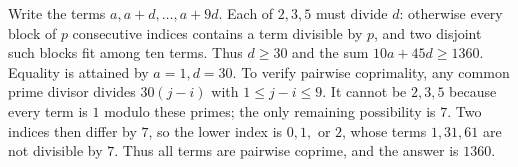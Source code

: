 Write the terms $a,a+d,\ldots,a+9d$. Each of $2,3,5$ must divide $d$: otherwise every block of $p$ consecutive indices contains a term divisible by $p$, and two disjoint such blocks fit among ten terms. Thus $d\ge30$ and the sum $10a+45d\ge1360$. Equality is attained by $a=1,d=30$. To verify pairwise coprimality, any common prime divisor divides $30(j-i)$ with $1\le j-i\le9$. It cannot be $2,3,5$ because every term is $1$ modulo these primes; the only remaining possibility is $7$. Two indices then differ by $7$, so the lower index is $0,1,$ or $2$, whose terms $1,31,61$ are not divisible by $7$. Thus all terms are pairwise coprime, and the answer is $\boxed{1360}$.
